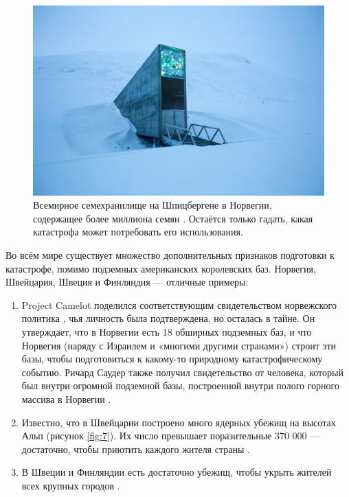 \documentclass[10pt,twocolumn,letterpaper]{article}
\begin{document}
\begin{figure}[t]
\begin{center}
   \includegraphics[width=1\linewidth]{svalbard.jpg}
\end{center}
   \caption{Всемирное семехранилище на Шпицбергене в Норвегии, содержащее более миллиона семян \cite{24}. Остаётся только гадать, какая катастрофа может потребовать его использования.}
\label{fig:8}
\label{fig:onecol}
\end{figure}

Во всём мире существует множество дополнительных признаков подготовки к катастрофе, помимо подземных американских королевских баз. Норвегия, Швейцария, Швеция и Финляндия — отличные примеры:

\begin{flushleft}
\begin{enumerate}
    \item Project Camelot поделился соответствующим свидетельством норвежского политика \cite{25,26}, чья личность была подтверждена, но осталась в тайне. Он утверждает, что в Норвегии есть 18 обширных подземных баз, и что Норвегия (наряду с Израилем и «многими другими странами») строит эти базы, чтобы подготовиться к какому-то природному катастрофическому событию. Ричард Саудер также получил свидетельство от человека, который был внутри огромной подземной базы, построенной внутри полого горного массива в Норвегии \cite{22}.
    \item Известно, что в Швейцарии построено много ядерных убежищ на высотах Альп (рисунок \ref{fig:7}). Их число превышает поразительные 370 000 — достаточно, чтобы приютить каждого жителя страны \cite{27}.
    \item В Швеции и Финляндии есть достаточно убежищ, чтобы укрыть жителей всех крупных городов \cite{27}.
\end{enumerate}
\end{flushleft}
\end{document}
